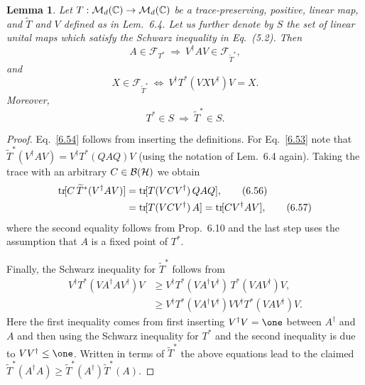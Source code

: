 \documentclass[11pt,a4paper]{article}
\theoremstyle{plain}
\newtheorem{lemma}{Lemma}[section]
\theoremstyle{definition}
\theoremstyle{remark}
\begin{document}
\begin{lemma}
    Let $T:\mathcal{M}_d(\mathbb{C})\to\mathcal{M}_d(\mathbb{C})$ be a trace-preserving, positive, linear map, and
    $\widetilde{T}$ and $V$ defined as in Lem.~6.4. Let us further denote by $S$ the
    set of linear unital maps which satisfy the Schwarz inequality in Eq.~(5.2). Then
    \begin{equation}\tag{6.53}
        A\in \mathcal{F}_{T^*}\ \Rightarrow\ V^\dagger A V \in \mathcal{F}_{\widetilde{T}^*},
    \end{equation}
    and
    \begin{equation}\tag{6.54}
        X\in \mathcal{F}_{\widetilde{T}^*}
        \ \Leftrightarrow\
        V^\dagger T^*(VXV^\dagger)V = X.
    \end{equation}
    Moreover,
    \begin{equation}\tag{6.55}
        T^*\in S\ \Rightarrow\ \widetilde{T}^*\in S.
    \end{equation}
\end{lemma}

\begin{proof}
    Eq.~\eqref{6.54} follows from inserting the definitions. For Eq.~\eqref{6.53}
    note that
    $\widetilde{T}^*(V^\dagger A V)=V^\dagger T^*(QAQ)V$ (using the notation of
    Lem.~6.4 again). Taking the trace with an arbitrary $C\in\mathcal{B}(\mathcal{H})$ we obtain
    \begin{align}
        \operatorname{tr}\![C\,\widetilde{T}^*(V^\dagger A V)]
         &= \operatorname{tr}\![T(VCV^\dagger)\,QAQ], \tag{6.56}\\
         &= \operatorname{tr}\![T(VCV^\dagger)\,A]
        = \operatorname{tr}\![CV^\dagger A V], \tag{6.57}
    \end{align}
    where the second equality follows from Prop.~6.10 and the last step uses the
    assumption that $A$ is a fixed point of $T^*$.

    Finally, the Schwarz inequality for $\widetilde{T}^*$ follows from
    \begin{align}
        V^\dagger T^*(VA^\dagger AV^\dagger)V
         &\ge V^\dagger T^*(VA^\dagger V^\dagger)\,T^*(VAV^\dagger)V, \tag{6.58}\\
         &\ge V^\dagger T^*(VA^\dagger V^\dagger)V
        V^\dagger T^*(VAV^\dagger)V. \tag{6.59}
    \end{align}
    Here the first inequality comes from first inserting $V^\dagger V=\one$ between
    $A^\dagger$ and $A$ and then using the Schwarz inequality for $T^*$ and the
    second inequality is due to $VV^\dagger\le \one$. Written in terms of
    $\widetilde{T}^*$ the above equations lead to the claimed
    $\widetilde{T}^*(A^\dagger A)\ge \widetilde{T}^*(A^\dagger)\widetilde{T}^*(A)$.
\end{proof}
\end{document}
